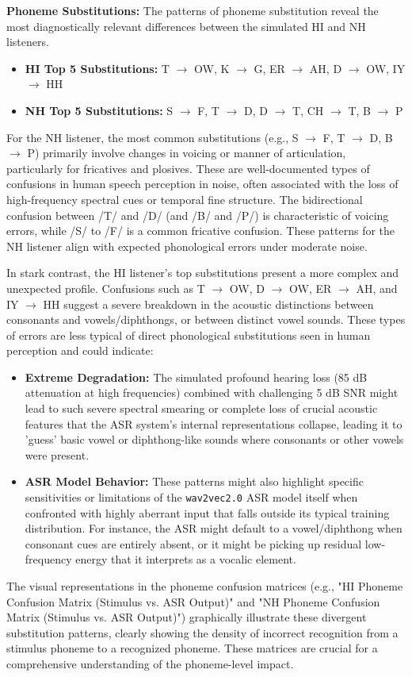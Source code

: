 \documentclass{article}
\begin{document}
\textbf{Phoneme Substitutions:}
The patterns of phoneme substitution reveal the most diagnostically relevant differences between the simulated HI and NH listeners.
\begin{itemize}
    \item \textbf{HI Top 5 Substitutions:} T $\rightarrow$ OW, K $\rightarrow$ G, ER $\rightarrow$ AH, D $\rightarrow$ OW, IY $\rightarrow$ HH
    \item \textbf{NH Top 5 Substitutions:} S $\rightarrow$ F, T $\rightarrow$ D, D $\rightarrow$ T, CH $\rightarrow$ T, B $\rightarrow$ P
\end{itemize}
For the NH listener, the most common substitutions (e.g., S $\rightarrow$ F, T $\rightarrow$ D, B $\rightarrow$ P) primarily involve changes in voicing or manner of articulation, particularly for fricatives and plosives. These are well-documented types of confusions in human speech perception in noise, often associated with the loss of high-frequency spectral cues or temporal fine structure. The bidirectional confusion between /T/ and /D/ (and /B/ and /P/) is characteristic of voicing errors, while /S/ to /F/ is a common fricative confusion. These patterns for the NH listener align with expected phonological errors under moderate noise.

In stark contrast, the HI listener's top substitutions present a more complex and unexpected profile. Confusions such as T $\rightarrow$ OW, D $\rightarrow$ OW, ER $\rightarrow$ AH, and IY $\rightarrow$ HH suggest a severe breakdown in the acoustic distinctions between consonants and vowels/diphthongs, or between distinct vowel sounds. These types of errors are less typical of direct phonological substitutions seen in human perception and could indicate:
\begin{itemize}
    \item \textbf{Extreme Degradation:} The simulated profound hearing loss (85 dB attenuation at high frequencies) combined with challenging 5 dB SNR might lead to such severe spectral smearing or complete loss of crucial acoustic features that the ASR system's internal representations collapse, leading it to 'guess' basic vowel or diphthong-like sounds where consonants or other vowels were present.
    \item \textbf{ASR Model Behavior:} These patterns might also highlight specific sensitivities or limitations of the \texttt{wav2vec2.0} ASR model itself when confronted with highly aberrant input that falls outside its typical training distribution. For instance, the ASR might default to a vowel/diphthong when consonant cues are entirely absent, or it might be picking up residual low-frequency energy that it interprets as a vocalic element.
\end{itemize}
The visual representations in the phoneme confusion matrices (e.g., "HI Phoneme Confusion Matrix (Stimulus vs. ASR Output)" and "NH Phoneme Confusion Matrix (Stimulus vs. ASR Output)") graphically illustrate these divergent substitution patterns, clearly showing the density of incorrect recognition from a stimulus phoneme to a recognized phoneme. These matrices are crucial for a comprehensive understanding of the phoneme-level impact.
\end{document}
